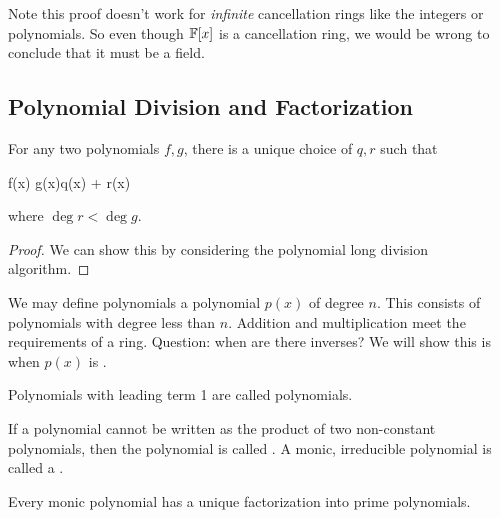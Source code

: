 \begin{remark}
  Note this proof doesn't work for \emph{infinite} cancellation rings
  like the integers or polynomials. So even though $\mathbb{F}[x]$ is a
  cancellation ring, we would be wrong to conclude that it must be a
  field.
\end{remark}

\subsection{Polynomial Division and Factorization}

\begin{theorem}
  For any two polynomials $f, g$, there is a unique choice of $q, r$
  such that

  \begin{nedqn}
    f(x)
  \eqcol
    g(x)q(x) + r(x)
  \end{nedqn}

  \noindent
  where $\deg r < \deg g$.
\end{theorem}

\begin{proof}
  We can show this by considering the polynomial long division
  algorithm.
\end{proof}

\begin{definition}
  We may define polynomials  a polynomial $p(x)$ of
  degree $n$. This consists of polynomials with degree less than $n$.
  Addition and multiplication meet the requirements of a ring. Question:
  when are there inverses? We will show this is when $p(x)$ is
  .
\end{definition}

\begin{definition}
  Polynomials with leading term 1 are called  polynomials.

  If a polynomial cannot be written as the product of two non-constant
  polynomials, then the polynomial is called . A
  monic, irreducible polynomial is called a .
\end{definition}

\begin{proposition}
  Every monic polynomial has a unique factorization into prime
  polynomials.
\end{proposition}

